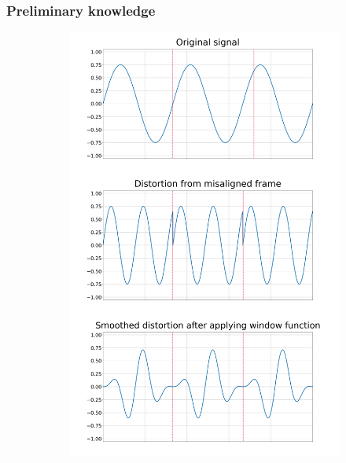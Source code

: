 \documentclass[table]{beamer}
\begin{document}
\begin{frame}
\frametitle{Preliminary knowledge}
    \begin{figure}[H]
        \begin{subfigure}{.40\textwidth}
            \includegraphics[width=\linewidth]{figures/framedistortion.png}

\end{subfigure}
\end{figure}
\end{frame}
\end{document}
